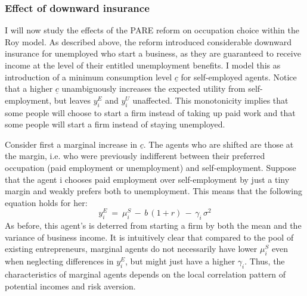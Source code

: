\subsubsection*{Effect of downward insurance}

I will now study the effects of the PARE reform on occupation choice within the Roy model. As described above, the reform introduced considerable downward insurance for unemployed who start a business, as they are guaranteed to receive income at the level of their entitled unemployment benefits. I model this as introduction of a minimum consumption level $\underline{c}$ for self-employed agents.
Notice that a higher $\underline{c}$ unambiguously increases the expected utility from self-employment, but leaves $y_i^E$ and $y_i^U$ unaffected. This monotonicity implies that some people will choose to start a firm instead of taking up paid work and that some people will start a firm instead of staying unemployed. \newline

\noindent Consider first a marginal increase in $\underline{c}$. The agents who are shifted are those at the margin, i.e. who were previously indifferent between their preferred occupation (paid employment or unemployment) and self-employment. Suppose that the agent i chooses paid employment over self-employment by just a tiny margin and weakly prefers both to unemployment. This means that the following equation holds for her:
\begin{equation}
y^E_i \:  = \:  \mu^S_i \, - \,  b \, (1+r) \, - \, \gamma_i \, \sigma^2
\end{equation} 
As before, this agent's is deterred from starting a firm by both the mean and the variance of business income. It is intuitively clear that compared to the pool of existing entrepreneurs, marginal agents do not necessarily have lower $\mu^S_i$ even when neglecting differences in $y^E_i$, but might just have a higher $\gamma_i$. Thus, the characteristics of marginal agents depends on the local correlation pattern of potential incomes and risk aversion. \newline

